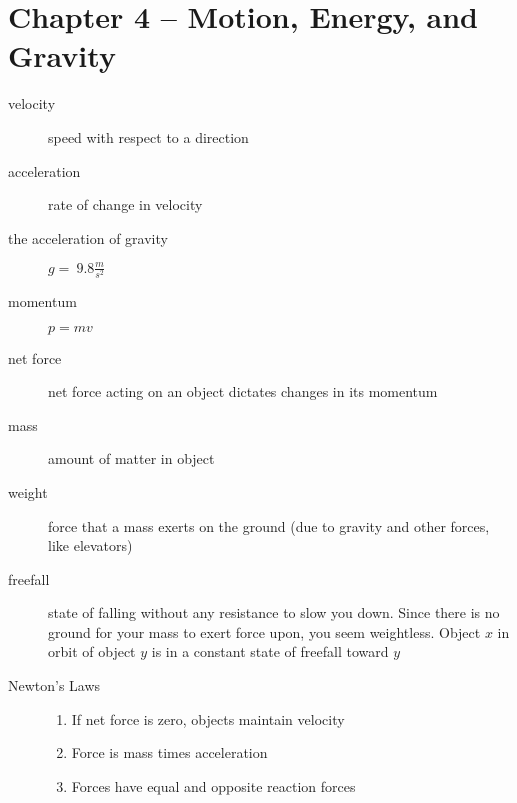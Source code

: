 \section{Chapter 4 -- Motion, Energy, and Gravity}
\begin{description}
\item[velocity] speed with respect to a direction
\item[acceleration] rate of change in velocity
\item[the acceleration of gravity] $g = ~9.8 \frac{m}{s^2}$
\item[momentum] $p = mv$
\item[net force] net force acting on an object dictates changes in its momentum
\item[mass] amount of matter in object
\item[weight] force that a mass exerts on the ground (due to gravity and other forces, like elevators)
\item[freefall] state of falling without any resistance to slow you down. Since there is no ground for your mass to exert force upon, you seem weightless. Object $x$ in orbit of object $y$ is in a constant state of freefall toward $y$
\item[Newton's Laws]
\begin{enumerate}
\item If net force is zero, objects maintain velocity
\item Force is mass times acceleration
\item Forces have equal and opposite reaction forces
\end{enumerate}
\end{description}


